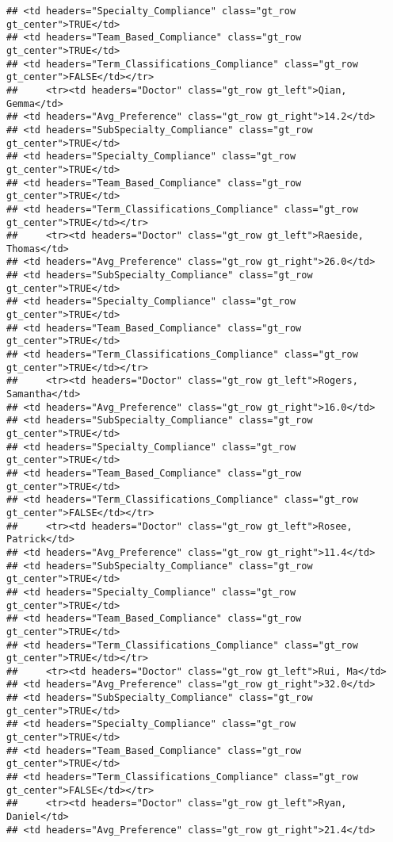 \documentclass[
]{article}
\begin{document}
\begin{verbatim}
## <td headers="Specialty_Compliance" class="gt_row gt_center">TRUE</td>
## <td headers="Team_Based_Compliance" class="gt_row gt_center">TRUE</td>
## <td headers="Term_Classifications_Compliance" class="gt_row gt_center">FALSE</td></tr>
##     <tr><td headers="Doctor" class="gt_row gt_left">Qian, Gemma</td>
## <td headers="Avg_Preference" class="gt_row gt_right">14.2</td>
## <td headers="SubSpecialty_Compliance" class="gt_row gt_center">TRUE</td>
## <td headers="Specialty_Compliance" class="gt_row gt_center">TRUE</td>
## <td headers="Team_Based_Compliance" class="gt_row gt_center">TRUE</td>
## <td headers="Term_Classifications_Compliance" class="gt_row gt_center">TRUE</td></tr>
##     <tr><td headers="Doctor" class="gt_row gt_left">Raeside, Thomas</td>
## <td headers="Avg_Preference" class="gt_row gt_right">26.0</td>
## <td headers="SubSpecialty_Compliance" class="gt_row gt_center">TRUE</td>
## <td headers="Specialty_Compliance" class="gt_row gt_center">TRUE</td>
## <td headers="Team_Based_Compliance" class="gt_row gt_center">TRUE</td>
## <td headers="Term_Classifications_Compliance" class="gt_row gt_center">TRUE</td></tr>
##     <tr><td headers="Doctor" class="gt_row gt_left">Rogers, Samantha</td>
## <td headers="Avg_Preference" class="gt_row gt_right">16.0</td>
## <td headers="SubSpecialty_Compliance" class="gt_row gt_center">TRUE</td>
## <td headers="Specialty_Compliance" class="gt_row gt_center">TRUE</td>
## <td headers="Team_Based_Compliance" class="gt_row gt_center">TRUE</td>
## <td headers="Term_Classifications_Compliance" class="gt_row gt_center">FALSE</td></tr>
##     <tr><td headers="Doctor" class="gt_row gt_left">Rosee, Patrick</td>
## <td headers="Avg_Preference" class="gt_row gt_right">11.4</td>
## <td headers="SubSpecialty_Compliance" class="gt_row gt_center">TRUE</td>
## <td headers="Specialty_Compliance" class="gt_row gt_center">TRUE</td>
## <td headers="Team_Based_Compliance" class="gt_row gt_center">TRUE</td>
## <td headers="Term_Classifications_Compliance" class="gt_row gt_center">TRUE</td></tr>
##     <tr><td headers="Doctor" class="gt_row gt_left">Rui, Ma</td>
## <td headers="Avg_Preference" class="gt_row gt_right">32.0</td>
## <td headers="SubSpecialty_Compliance" class="gt_row gt_center">TRUE</td>
## <td headers="Specialty_Compliance" class="gt_row gt_center">TRUE</td>
## <td headers="Team_Based_Compliance" class="gt_row gt_center">TRUE</td>
## <td headers="Term_Classifications_Compliance" class="gt_row gt_center">FALSE</td></tr>
##     <tr><td headers="Doctor" class="gt_row gt_left">Ryan, Daniel</td>
## <td headers="Avg_Preference" class="gt_row gt_right">21.4</td>

\end{verbatim}
\end{document}
